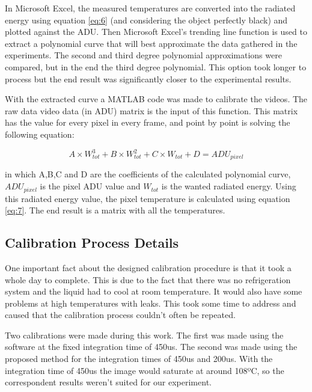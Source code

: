\par In Microsoft Excel, the measured temperatures are converted into the radiated energy using equation \ref{eq:6} (and considering the object perfectly black) and plotted against the ADU. Then Microsoft Excel's trending line function is used to extract a polynomial curve that will best approximate the data gathered in the experiments. The second and third degree polynomial approximations were compared, but in the end the third degree polynomial. This option took longer to process but the end result was significantly closer to the experimental results. \\

\par With the extracted curve a MATLAB code was made to calibrate the videos. The raw data video data (in ADU) matrix is the input of this function. This matrix has the value for every pixel in every frame, and point by point is solving the following equation:

\begin{equation}
A \times W_{tot}^3 + B \times W_{tot}^2 + C \times W_{tot} + D = ADU_{pixel}
\end{equation}

in which A,B,C and D are the coefficients of the calculated polynomial curve, $ADU_{pixel}$ is the pixel ADU value and $W_{tot}$ is the wanted radiated energy. Using this radiated energy value, the pixel temperature is calculated using equation \ref{eq:7}. The end result is a matrix with all the temperatures.

\subsection{Calibration Process Details}

\par One important fact about the designed calibration procedure is that it took a whole day to complete. This is due to the fact that there was no refrigeration system and the liquid had to cool at room temperature. It would also have some problems at high temperatures with leaks. This took some time to address and caused that the calibration process couldn't often be repeated. \\

\par Two calibrations were made during this work. The first was made using the software at the fixed integration time of 450us. The second was made using the proposed method for the integration times of 450us and 200us. With the integration time of 450us the image would saturate at around 108ºC, so the correspondent results weren't suited for our experiment. \\

